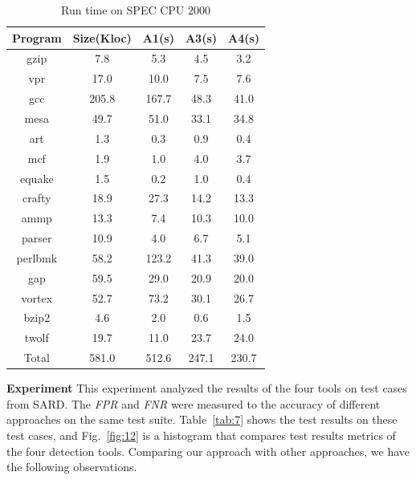 \begin{table}[!h]
\center
\caption{Run time on SPEC CPU $2000$}\label{tab:6}
\hspace{-0.5cm}\begin{tabular}{|c|c|c|c|c|}
\hline
\textbf{Program}& \textbf{Size(Kloc)} & \textbf{A1(s)} & \textbf{A3(s)} & \textbf{A4(s)}\\
\hline
gzip       & 7.8    & 5.3  & 4.5 & 3.2\\
\hline
vpr        & 17.0   & 10.0  & 7.5 & 7.6\\
\hline
gcc        & 205.8 & 167.7  & 48.3 & 41.0 \\
\hline
mesa     & 49.7   & 51.0  & 33.1 & 34.8\\
\hline
art         & 1.3     & 0.3  & 0.9 & 0.4\\
\hline
mcf        & 1.9     & 1.0  & 4.0 & 3.7\\
\hline
equake   & 1.5     & 0.2  & 1.0 & 0.4\\
\hline
crafty     & 18.9   & 27.3	 & 14.2	 & 13.3\\
\hline
ammp    & 13.3   & 7.4 & 10.3 & 10.0\\
\hline
parser    & 10.9   & 4.0	 & 6.7	 & 5.1\\
\hline
perlbmk & 58.2   & 123.2   & 41.3	 & 39.0\\
\hline
gap        & 59.5   &  29.0 & 20.9 & 20.0\\
\hline
vortex    & 52.7    & 73.2	 & 30.1	 & 26.7\\
\hline 
bzip2     & 4.6      & 2.0 & 0.6	 & 1.5\\
\hline
twolf     & 19.7     & 11.0 & 23.7	 & 24.0\\
\hline
Total     & 581.0    & 512.6 & 247.1 & 230.7\\
\hline
\end{tabular}
\end{table}

\noindent\textbf{Experiment } This experiment analyzed the results of the four tools on test cases from SARD. The \textit{FPR} and \textit{FNR} were measured to the accuracy of different approaches on the same test suite. Table~\ref{tab:7} shows the test results on these test cases, and Fig.~\ref{fig:12} is a histogram that compares test results metrics of the four detection tools. Comparing our approach with other approaches, we have the following observations.


